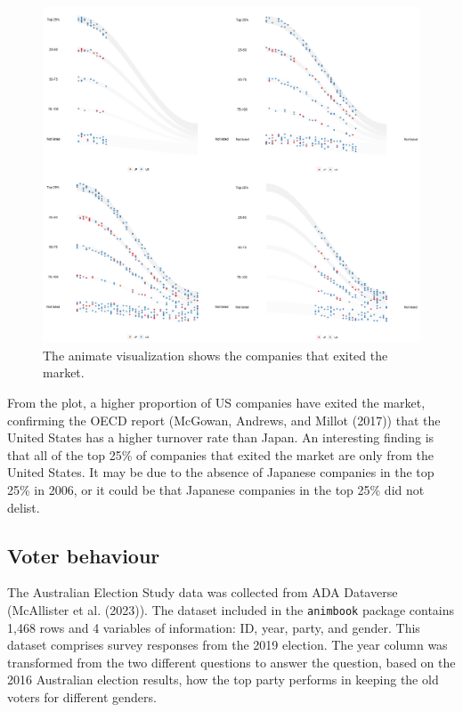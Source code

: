 \begin{figure}

{\centering \includegraphics[width=1\linewidth]{figures/animation-exit} 

}

\caption{The animate visualization shows the companies that exited the market.}\label{fig:osiris-figure}
\end{figure}

From the plot, a higher proportion of US companies have exited the market, confirming the OECD report (McGowan, Andrews, and Millot (2017)) that the United States has a higher turnover rate than Japan. An interesting finding is that all of the top 25\% of companies that exited the market are only from the United States. It may be due to the absence of Japanese companies in the top 25\% in 2006, or it could be that Japanese companies in the top 25\% did not delist.

\hypertarget{voter-behaviour}{%
\subsection{Voter behaviour}\label{voter-behaviour}}

The Australian Election Study data was collected from ADA Dataverse (McAllister et al. (2023)). The dataset included in the \texttt{animbook} package contains 1,468 rows and 4 variables of information: ID, year, party, and gender. This dataset comprises survey responses from the 2019 election. The year column was transformed from the two different questions to answer the question, based on the 2016 Australian election results, how the top party performs in keeping the old voters for different genders.

